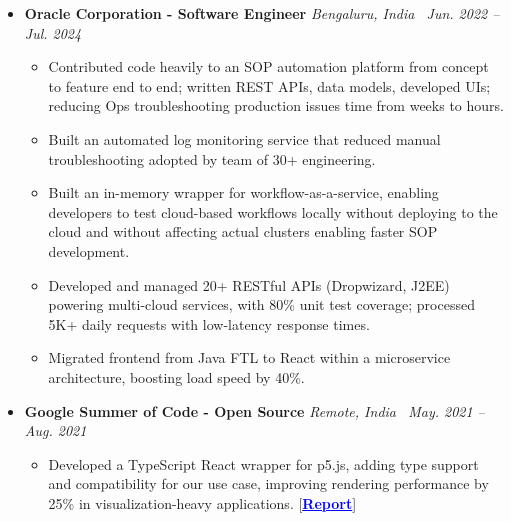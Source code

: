 \documentclass[A4,10pt]{article}
\begin{document}
\begin{itemize}[leftmargin=0in, label={}]
 \item \textbf{\fontsize{11}{12}\selectfont Oracle Corporation - Software Engineer} \hfill \textit{Bengaluru, India \textbar\  Jun. 2022 -- Jul. 2024} \\
    \vspace{-1mm}
  \begin{itemize}[leftmargin=0.25in, label=$\bullet$]
  \item{Contributed code heavily to an SOP automation platform from concept to feature end to end; written REST APIs, data models, developed UIs; reducing Ops troubleshooting production issues time from weeks to hours.}
    \item{Built an automated log monitoring service that reduced manual troubleshooting adopted by team of 30+ engineering.}
    \item{Built an in-memory wrapper for workflow-as-a-service, enabling developers to test cloud-based workflows locally without deploying to the cloud and without affecting actual clusters enabling faster SOP development.}
    \item {Developed and managed 20+ RESTful APIs (Dropwizard, J2EE) powering multi-cloud services, with 80\% unit test coverage; processed 5K+ daily requests with low-latency response times.}
    \item{Migrated frontend from Java FTL to React within a microservice architecture, boosting load speed by 40\%.}
  \end{itemize}
    \vspace{-2mm}

    \item \textbf{\fontsize{11}{12}\selectfont Google Summer of Code - Open Source} \hfill \textit{Remote, India \textbar\  May. 2021 -- Aug. 2021} \\
    \vspace{-1mm}
  \begin{itemize}[leftmargin=0.25in, label=$\bullet$]
    \item{Developed a TypeScript React wrapper for p5.js, adding type support and compatibility for our use case, improving rendering performance by 25\% in visualization-heavy applications.} [\href{https://github.com/b18050/gsoc-musicblocks-graphics-management}{\textcolor{blue}{\textbf{\underline{Report}}}}] 
  \end{itemize}
\vspace{-2mm}

    

    
  \end{itemize}
\vspace{-4.5mm}
\end{document}
